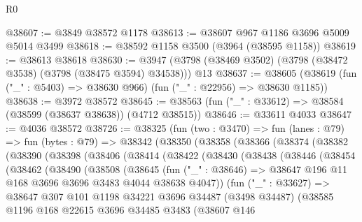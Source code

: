 \begin{lexlean}{R0}
\begin{coremodule}
@38607 := @3849 @38572 @1178
@38613 := @38607 @967 @1186 @3696 @5009 @5014 @3499
@38618 := @38592 @1158 @3500 (@3964 (@38595 @1158))
@38619 := @38613 @38618
@38630 := @3947 (@3798 (@38469 @3502) (@3798 (@38472 @3538) (@3798 (@38475 @3594) @34538))) @13
@38637 := @38605 (@38619 (fun ("_" : @5403) => @38630 @966) (fun ("_" : @22956) => @38630 @1185))
@38638 := @3972 @38572
@38645 := @38563 (fun ("_" : @33612) => @38584 (@38599 (@38637 @38638)) (@4712 @38515))
@38646 := @33611 @4033
@38647 := @4036 @38572
@38726 := @38325
    (fun (two : @3470) =>
    fun (lanes : @79) =>
    fun (bytes : @79) =>
    @38342
      (@38350
        (@38358
          (@38366
            (@38374
              (@38382
                (@38390
                  (@38398
                    (@38406
                      (@38414
                        (@38422
                          (@38430
                            (@38438
                              (@38446
                                (@38454
                                  (@38462
                                    (@38490
                                      (@38508
                                        (@38645
                                          (fun ("_" : @38646) =>
                                          @38647
                                            @196
                                            @11
                                            @168
                                            @3696
                                            @3696
                                            @3483
                                            @4044
                                            @38638
                                            @4047))
                                        (fun ("_" : @33627) =>
                                        @38647
                                          @307
                                          @101
                                          @1198
                                          @34221
                                          @3696
                                          @34487
                                          (@3498 @34487)
                                          (@38585
                                            @1196
                                            @168
                                            @22615
                                            @3696
                                            @34485
                                            @3483
                                            (@38607
                                              @146

\end{coremodule}
\end{lexlean}
